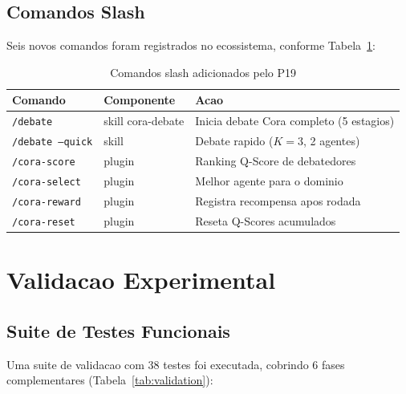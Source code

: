 \documentclass[5p]{elsarticle}
\begin{document}
\subsection{Comandos Slash}

Seis novos comandos foram registrados no ecossistema, conforme Tabela~\ref{tab:commands}:

\begin{table}[H]
  \centering
  \caption{Comandos slash adicionados pelo P19}
  \label{tab:commands}
  \begin{tabular}{lll}
    \toprule
    \textbf{Comando} & \textbf{Componente} & \textbf{Acao} \\
    \midrule
    \texttt{/debate} & skill cora-debate & Inicia debate Cora completo (5 estagios) \\
    \texttt{/debate --quick} & skill & Debate rapido ($K=3$, 2 agentes) \\
    \texttt{/cora-score} & plugin & Ranking Q-Score de debatedores \\
    \texttt{/cora-select} & plugin & Melhor agente para o dominio \\
    \texttt{/cora-reward} & plugin & Registra recompensa apos rodada \\
    \texttt{/cora-reset} & plugin & Reseta Q-Scores acumulados \\
    \bottomrule
  \end{tabular}
\end{table}

\section{Validacao Experimental}

\subsection{Suite de Testes Funcionais}

Uma suite de validacao com 38 testes foi executada, cobrindo 6 fases complementares (Tabela~\ref{tab:validation}):
\end{document}
